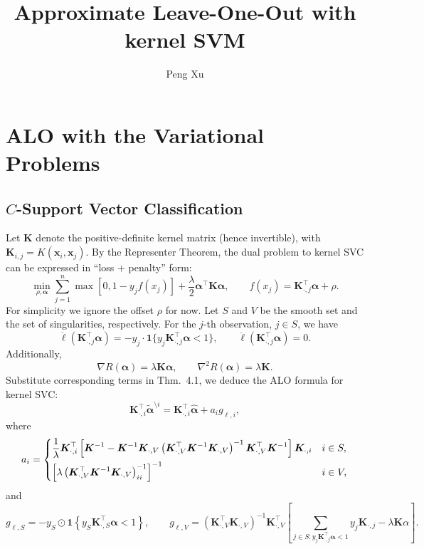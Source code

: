 \documentclass[11pt]{article}
\title{Approximate Leave-One-Out with kernel SVM}
\author{Peng Xu}
\newcommand{\bx}{\bm{x}}
\newcommand{\bK}{\bm{K}}
\newcommand{\balpha}{\bm{\alpha}}
\newcommand{\refthm}[2]{#1~#2}
\begin{document}
\maketitle

\section{ALO with the Variational Problems}
\subsection{\(C\)-Support Vector Classification}
Let \(\bK\) denote the positive-definite kernel matrix (hence invertible), with \(\bK_{i,j}=K(\bx_i,\bx_j)\). By the Representer Theorem, the dual problem to kernel SVC can be expressed in ``loss \(+\) penalty'' form:
\begin{equation}
\min_{\rho,\balpha}\sum_{j=1}^{n}\max\left[0, 1-y_jf(x_j)\right]+\frac{\lambda}{2}\balpha^\top\bK\balpha, \qquad f(x_j)=\bK_{\cdot,j}^\top\balpha+\rho.
\end{equation}
For simplicity we ignore the offset \(\rho\) for now. Let \(S\) and \(V\) be the smooth set and the set of singularities, respectively. For the \(j\)-th observation, \(j\in S\), we have \[\dot{\ell}(\bK_{\cdot,j}^\top\balpha)=-y_j\cdot\bm{1}\{y_j\bK_{\cdot,j}^\top\balpha<1\},\qquad\ddot{\ell}(\bK_{\cdot,j}^\top\balpha)=0.\] Additionally, \[\nabla R(\balpha)=\lambda\bK\balpha,\qquad\nabla^2R(\balpha)=\lambda\bK.\] Substitute corresponding terms in \refthm{Thm.}{4.1}, we deduce the ALO formula for kernel SVC: \[\bK_{\cdot,i}^\top\tilde{\balpha}^{\setminus i}=\bK_{\cdot,i}^\top\hat{\balpha}+a_ig_{\ell,i},\] where \[a_i=\begin{dcases}
\frac{1}{\lambda}\bK_{\cdot,i}^\top\left[\bK^{-1}-\bK^{-1}\bK_{\cdot,V}\left(\bK_{\cdot,V}^\top\bK^{-1}\bK_{\cdot,V}\right)^{-1}\bK_{\cdot,V}^\top\bK^{-1}\right]\bK_{\cdot,i} & i\in S,\\
\left[\lambda\left(\bK_{\cdot,V}^\top\bK^{-1}\bK_{\cdot,V}\right)^{-1}_{ii}\right]^{-1} & i\in V,
\end{dcases}\] and \[g_{\ell, S}=-y_S\odot\bm{1}\left\{y_S\bK_{\cdot,S}^\top\balpha<1\right\},\qquad g_{\ell, V}=\left(\bK_{\cdot,V}^\top\bK_{\cdot,V}\right)^{-1}\bK_{\cdot,V}^\top\left[\sum_{j\in S:y_j\bK_{\cdot,j}^\top\balpha<1}y_j\bK_{\cdot,j}-\lambda\bK\alpha\right].\]
\end{document}

